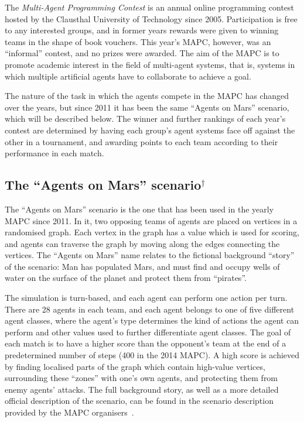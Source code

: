 The \emph{Multi-Agent Programming Contest} is an annual online programming contest hosted by the Clausthal University of Technology since 2005.
Participation is free to any interested groups, and in former years rewards were given to winning teams in the shape of book vouchers.
This year's MAPC, however, was an \enquote{informal} contest, and no prizes were awarded.
The aim of the MAPC is to promote academic interest in the field of multi-agent systems, that is, systems in which multiple artificial agents have to collaborate to achieve a goal.

The nature of the task in which the agents compete in the MAPC has changed over the years, but since 2011 it has been the same \enquote{Agents on Mars} scenario, which will be described below.
The winner and further rankings of each year's contest are determined by having each group's agent systems face off against the other in a tournament, and awarding points to each team according to their performance in each match.

\subsection{The \enquote{Agents on Mars} scenario$^\dagger$}
The \enquote{Agents on Mars} scenario is the one that has been used in the yearly MAPC since 2011.
In it, two opposing teams of agents are placed on vertices in a randomised graph.
Each vertex in the graph has a value which is used for scoring, and agents can traverse the graph by moving along the edges connecting the vertices.
The \enquote{Agents on Mars} name relates to the fictional background \enquote{story} of the scenario: Man has populated Mars, and must find and occupy wells of water on the surface of the planet and protect them from \enquote{pirates}.

The simulation is turn-based, and each agent can perform one action per turn.
There are 28 agents in each team, and each agent belongs to one of five different agent classes, where the agent's type determines the kind of actions the agent can perform and other values used to further differentiate agent classes.
The goal of each match is to have a higher score than the opponent's team at the end of a predetermined number of steps (400 in the 2014 MAPC).
A high score is achieved by finding localised parts of the graph which contain high-value vertices, surrounding these \enquote{zones} with one's own agents, and protecting them from enemy agents' attacks.
The full background story, as well as a more detailed official description of the scenario, can be found in the scenario description provided by the MAPC organisers~\cite{ahlbrecht_mapc_2014}.

